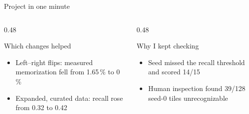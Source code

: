 \documentclass[aspectratio=169,10pt,t]{beamer}
\begin{document}
\begin{frame}{Project in one minute}
\vspace{0.15cm}
\begin{columns}[T]
\begin{column}{0.48\linewidth}
\begin{block}{Which changes helped}
\footnotesize\begin{itemize}\setlength{\itemsep}{0pt}
\item Left--right flips: measured memorization fell from 1.65\,\% to 0\,\%
\item Expanded, curated data: recall rose from 0.32 to 0.42
\end{itemize}
\end{block}
\end{column}
\begin{column}{0.48\linewidth}
\begin{block}{Why I kept checking}
\footnotesize\begin{itemize}\setlength{\itemsep}{0pt}
\item Seed \lowSeed{} missed the recall threshold and scored 14/15
\item Human inspection found 39/128 seed-0 tiles unrecognizable
\end{itemize}
\end{block}
\end{column}
\end{columns}
\end{frame}
\end{document}
